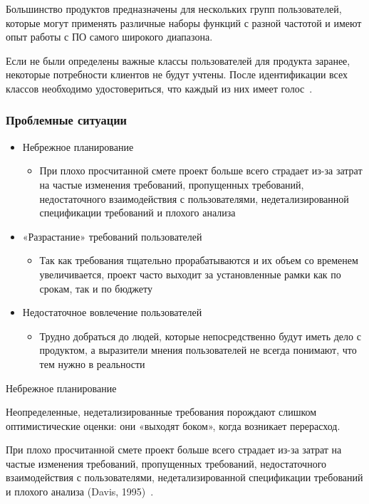 \documentclass{../industrial-development}
\begin{document}
{Большинство продуктов предназначены для нескольких групп пользователей, которые могут применять различные наборы функций с разной частотой и имеют опыт работы с ПО самого широкого диапазона.

Если не были определены важные классы пользователей для продукта заранее, некоторые потребности клиентов не будут учтены.
После идентификации всех классов необходимо удостовериться, что каждый из них имеет голос~\cite[с.~19]{Wiegers}.


\begin{frame} \frametitle {Проблемные ситуации}
\begin{itemize}

\item \alert{Небрежное планирование} 
\begin{itemize}
\item При плохо просчитанной смете проект больше всего страдает из-за затрат на частые изменения требований, пропущенных требований, недостаточного взаимодействия с пользователями, недетализированной спецификации требований и плохого анализа
\end{itemize}

\item \alert{«Разрастание» требований пользователей}
\begin{itemize}
\item Так как требования тщательно прорабатываются и их объем со временем увеличивается, проект часто выходит за установленные рамки как по срокам, так и по бюджету
\end{itemize}

\item \alert{Недостаточное вовлечение пользователей}
\begin{itemize}
\item  Трудно добраться до людей, которые непосредственно будут иметь дело с продуктом, а выразители мнения пользователей не всегда понимают, что тем нужно в реальности
\end{itemize}

\end{itemize}
\end{frame}

\lecturenotes

\alert{Небрежное планирование}

Неопределенные, недетализированные требования порождают слишком оптимистические оценки: они «выходят боком», когда возникает перерасход.

При плохо просчитанной смете проект больше всего страдает из-за затрат на частые изменения требований, пропущенных требований, недостаточного взаимодействия с пользователями, недетализированной спецификации требований и плохого
анализа (Davis, 1995)~\cite[с.~20]{Wiegers}.

}
\end{document}
